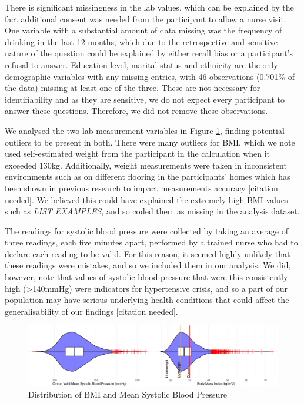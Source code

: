 \documentclass[
  11pt,
]{article}
\begin{document}
There is significant missingness in the lab values, which can be
explained by the fact additional consent was needed from the participant
to allow a nurse visit. One variable with a substantial amount of data
missing was the frequency of drinking in the last 12 months, which due
to the retrospective and sensitive nature of the question could be
explained by either recall bias or a participant's refusal to answer.
Education level, marital status and ethnicity are the only demographic
variables with any missing entries, with 46 observations (0.701\% of the
data) missing at least one of the three. These are not necessary for
identifiability and as they are sensitive, we do not expect every
participant to answer these questions. Therefore, we did not remove
these observations.

We analysed the two lab measurement variables in Figure
\ref{fig:output-distribution-plots}, finding potential outliers to be
present in both. There were many outliers for BMI, which we note used
self-estimated weight from the participant in the calculation when it
exceeded 130kg. Additionally, weight measurements were taken in
inconsistent environments such as on different flooring in the
participants' homes which has been shown in previous research to impact
measurements accuracy {[}citation needed{]}. We believed this could have
explained the extremely high BMI values such as \emph{LIST EXAMPLES},
and so coded them as missing in the analysis dataset.

The readings for systolic blood pressure were collected by taking an
average of three readings, each five minutes apart, performed by a
trained nurse who had to declare each reading to be valid. For this
reason, it seemed highly unlikely that these readings were mistakes, and
so we included them in our analysis. We did, however, note that values
of systolic blood pressure that were this consistently high
(\textgreater140mmHg) were indicators for hypertensive crisis, and so a
part of our population may have serious underlying health conditions
that could affect the generalisability of our findings {[}citation
needed{]}.

\begin{figure}[H]
\includegraphics{Coursework_files/figure-latex/output-distribution-plots-1} \caption{Distribution of BMI and Mean Systolic Blood Pressure}\label{fig:output-distribution-plots}
\end{figure}
\end{document}
